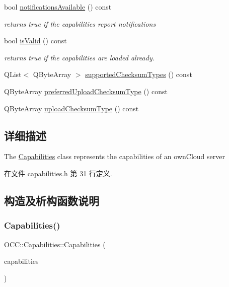 \begin{DoxyCompactItemize}
bool \hyperlink{class_o_c_c_1_1_capabilities_aadcf59b4ebcac111c38c170b8228af22}{notifications\+Available} () const
\begin{DoxyCompactList}\small\item\em returns true if the capabilities report notifications \end{DoxyCompactList}\item 
bool \hyperlink{class_o_c_c_1_1_capabilities_a4ed089291d286241784d1c7534fd1b35}{is\+Valid} () const
\begin{DoxyCompactList}\small\item\em returns true if the capabilities are loaded already. \end{DoxyCompactList}\item 
Q\+List$<$ Q\+Byte\+Array $>$ \hyperlink{class_o_c_c_1_1_capabilities_afc3e38d87609e09b13cfd6c757f35210}{supported\+Checksum\+Types} () const
\item 
Q\+Byte\+Array \hyperlink{class_o_c_c_1_1_capabilities_a1472ad6e939b125731068ca8bdd99176}{preferred\+Upload\+Checksum\+Type} () const
\item 
Q\+Byte\+Array \hyperlink{class_o_c_c_1_1_capabilities_aabada7d4638d3e2fedf8651b46706fcf}{upload\+Checksum\+Type} () const
\end{DoxyCompactItemize}


\subsection{详细描述}
The \hyperlink{class_o_c_c_1_1_capabilities}{Capabilities} class represents the capabilities of an own\+Cloud server 

在文件 capabilities.\+h 第 31 行定义.



\subsection{构造及析构函数说明}
\mbox{\label{class_o_c_c_1_1_capabilities_abdb4d91106d42ef256c31986cd77de38}} 
\subsubsection{\texorpdfstring{Capabilities()}{Capabilities()}}
{\footnotesize\ttfamily O\+C\+C\+::\+Capabilities\+::\+Capabilities (\begin{DoxyParamCaption}\item[{const Q\+Variant\+Map \&}]{capabilities }\end{DoxyParamCaption})}



